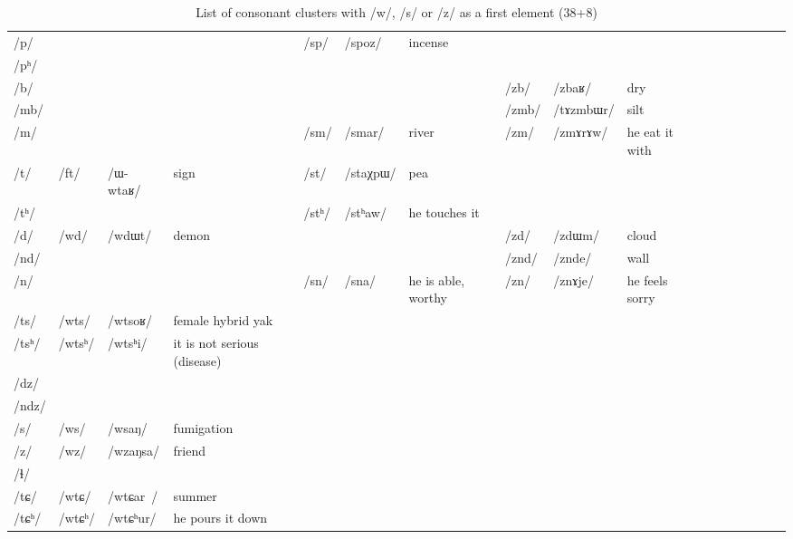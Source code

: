 \documentclass[oldfontcommands,oneside,a4paper,11pt]{article}
\newcommand{\ipa}[1]{\mbox{/#1/}} %
\newcommand{\deux}[1]{/#1/}
\newcommand{\tib}[1]{\cellcolor{lightgray}\textbf{#1}}
\begin{document}
 \begin{landscape}
 \begin{longtable}{l|lll|lll|lll|lllllll}
 \caption{List of consonant clusters with \ipa{w}, \ipa{s} or \ipa{z} as a first element (38+8)} \\%
\toprule
\ipa{p}  &	  &	  &	&	\deux{sp}  &	\ipa{spoz}  &	incense&	  &	  &	&	\\
\ipa{pʰ}  &	  &	  &	&	  &	  &	&	  &	  &	&	\\
\ipa{b}  &	  &	  &	&	  &	  &	&	\deux{zb}  &	\ipa{zbaʁ}  &dry	&	\\
\ipa{mb}  &	  &	  &	&	  &	  &	&	\deux{zmb}  &	\ipa{tɤzmbɯr}  &	silt&	\\
\ipa{m}  &	  &	  &	&	\deux{sm}  &	\ipa{smar}  &river	&	\deux{zm}  &	\ipa{zmɤrɤw}  &	he eat it with&	\\
\ipa{t}  &	\deux{ft}  &	\ipa{ɯ-wtaʁ}  &	sign&	\deux{st}  &	\ipa{staχpɯ}  &	pea&	  &	  &	&	\\
\ipa{tʰ}  &	  &	  &	&	\deux{stʰ}  &	\ipa{stʰaw}  &he touches it	&	  &	  &	&	\\
\ipa{d}  &	\deux{wd}  &	\ipa{wdɯt}  &demon	&	  &	  &	&	\deux{zd}  &	\ipa{zdɯm}  &cloud	&	\\
\ipa{nd}  &	  &	  &	&	  &	  &	&	\deux{znd}  &	\ipa{znde}  &	wall&	\\
\ipa{n}  &	  &	  &	&	\deux{sn}  &	\ipa{sna}  & he is	able, worthy&	\deux{zn}  &	\ipa{znɤje}  &he feels sorry 	&	\\
\ipa{ts}  &	\deux{wts}  &	\ipa{wtsoʁ}  &female hybrid yak	&	  &	  &	&	  &	  &	&	\\
\ipa{tsʰ}  &	\deux{wtsʰ}  &	\ipa{wtsʰi}  &	it is not serious (disease)&	  &	  &	&	  &	  &	&	\\
\ipa{dz}  &	  &	  &	&	  &	  &	&	  &	  &	&	\\
\ipa{ndz}  &	  &	  &	&	  &	  &	&	  &	  &	&	\\
\ipa{s}  &	\deux{ws}  &	\ipa{wsaŋ}  &	fumigation&	  &	  &	&	  &	  &	&	\\
\ipa{z}  &	\deux{wz} \tib{}  &	\ipa{wzaŋsa}  &	friend&	  &	  &	&	  &	  &	&	\\
\ipa{ɬ}  &	  &	  &	&	  &	  &	&	  &	  &	&	\\
\ipa{tɕ}  &	\deux{wtɕ}  &	\ipa{wtɕar }  &	summer&	  &	  &	&	  &	  &	&	\\
\ipa{tɕʰ}  &	\deux{wtɕʰ}  &	\ipa{wtɕʰur}  &he pours it down	&	  &	  &	&	  &	  &	&	\\

\end{longtable}
\end{landscape}
\end{document}
